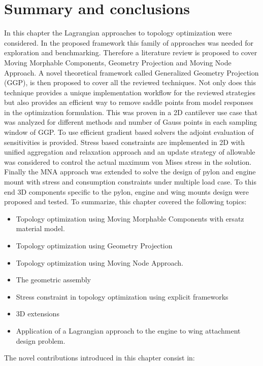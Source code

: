 \section{Summary and conclusions}
In this chapter the Lagrangian approaches to topology optimization were considered. In the proposed framework this family of approaches was needed for exploration and benchmarking. Therefore a literature review is proposed to cover Moving Morphable Components, Geometry Projection and Moving Node Approach. A novel theoretical framework called Generalized Geometry Projection (GGP), is then proposed to cover all the reviewed techniques. Not only does this technique provides a unique implementation workflow for the reviewed strategies but also provides an efficient way to remove saddle points from model responses in the optimization formulation. This was proven in a 2D cantilever use case that was analyzed for different methods and number of Gauss points in each sampling window of GGP. To use efficient gradient based solvers the adjoint evaluation of sensitivities is provided. Stress based constraints are implemented in 2D with unified aggregation and relaxation approach and an update strategy of allowable was considered to control the actual maximum von Mises stress in the solution. Finally the MNA approach was extended to solve the design of pylon and engine mount with stress and consumption constraints under multiple load case. To this end 3D components specific to the pylon, engine and wing mounts design were proposed and tested. To summarize, this chapter covered the following topics:
\begin{itemize}
\item Topology optimization using Moving Morphable Components with ersatz material model.
\item Topology optimization using Geometry Projection
\item Topology optimization using Moving Node Approach.
\item The geometric assembly
\item Stress constraint in topology optimization using explicit frameworks
\item 3D extensions
\item Application of a Lagrangian approach to the engine to wing attachment design problem.
\end{itemize}
The novel contributions introduced in this chapter consist in:
